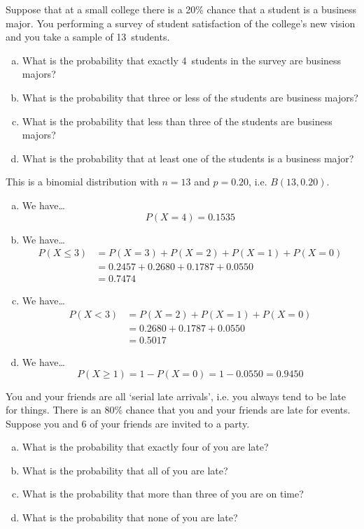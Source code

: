 \documentclass[11pt,letterpaper]{article}
\begin{document}

 Suppose that at a small college there is a 20\% chance that a student is a business major. You performing a survey of student satisfaction of the college's new vision and you take a sample of 13~students.
	\begin{enumerate}[(a)]
	\item What is the probability that exactly 4~students in the survey are business majors?
	\item What is the probability that three or less of the students are business majors?
	\item What is the probability that less than three of the students are business majors?
	\item What is the probability that at least one of the students is a business major?
	\end{enumerate} \pspace

\sol This is a binomial distribution with $n= 13$ and $p= 0.20$, i.e. $B(13, 0.20)$. 

\begin{enumerate}[(a)]
\item We have\dots
	\[
	P(X= 4)= 0.1535
	\] 

\item We have\dots
	\[
	\begin{aligned}
	P(X \leq 3)&= P(X= 3) + P(X= 2) + P(X= 1) + P(X= 0) \\[0.3cm]
	&= 0.2457 + 0.2680 + 0.1787 + 0.0550 \\[0.3cm]
	&= 0.7474 
	\end{aligned}
	\]

\item We have\dots
	\[
	\begin{aligned}
	P(X < 3)&= P(X= 2) + P(X= 1) + P(X= 0) \\[0.3cm]
	&= 0.2680 + 0.1787 + 0.0550 \\[0.3cm]
	&= 0.5017 
	\end{aligned}
	\] 

\item We have\dots
	\[
	P(X \geq 1)= 1 - P(X= 0)= 1 - 0.0550= 0.9450
	\]
\end{enumerate}



\newpage



 You and your friends are all `serial late arrivals', i.e. you always tend to be late for things. There is an 80\% chance that you and your friends are late for events. Suppose you and 6 of your friends are invited to a party.
	\begin{enumerate}[(a)]
	\item What is the probability that exactly four of you are late?
	\item What is the probability that all of you are late?
	\item What is the probability that more than three of you are on time?
	\item What is the probability that none of you are late?
	\end{enumerate} \pspace
\end{document}
